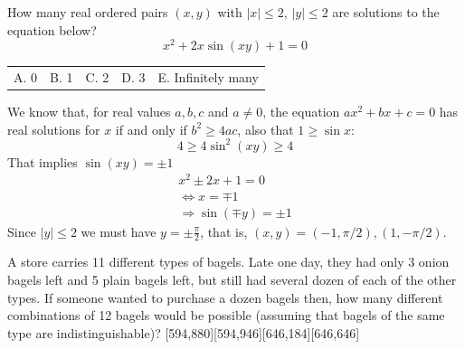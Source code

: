 \documentclass[12pt]{article}
\makeatletter
\newcounter{problem}
\newcommand{\multChoice}[5]{%
{\centering
\begin{tabular}{l @{\hskip 1.5cm} l @{\hskip 1.5cm} l @{\hskip 1.5cm} l @{\hskip 1.5cm} l}%
    A. #1 & B. #2 & C. #3 & D. #4 & E. #5
\end{tabular} \par}
}
\makeatother
\begin{document}
\begin{problem}
   How many real ordered pairs $(x,y)$ with $|x| \leq 2$, $|y| \leq 2$ are solutions to the equation below?
   $$x^2 + 2x\sin(xy) + 1 = 0$$
   \multChoice{0}{1}{2}{3}{Infinitely many}
\end{problem}

\begin{solution}[C]
   We know that, for real values $a,b,c$ and $a \neq 0$, the equation $ax^2+bx+c=0$ has real solutions for $x$ if and only if $b^2 \geq 4ac$, also that $1 \geq \sin x$:
    $$ 4 \geq 4\sin^2(xy) \geq 4$$
    That implies $\sin(xy)= \pm 1$ \\
    \begin{align*}
        x^2\pm2x+1=0 \\
        \iff x=\mp 1 \\
        \Rightarrow \sin(\mp y) = \pm1
    \end{align*}
    Since $|y| \leq 2$ we must have $y=\pm \frac{\pi}{2}$, that is, $(x,y)= (-1,\pi /2) , (1, -\pi/2)$.
\end{solution}

\begin{problem}
   A store carries 11 different types of bagels. Late one day, they had only 3 onion bagels left and 5 plain bagels left, but still had several dozen of each of the other types. If someone wanted to purchase a dozen bagels then, how many different combinations of 12 bagels would be possible (assuming that bagels of the same type are indistinguishable)?
   [594,880][594,946][646,184][646,646]
\end{problem}
\end{document}
